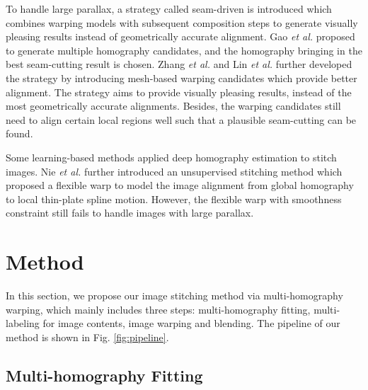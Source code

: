 \documentclass[10pt,twocolumn,letterpaper]{article}
\begin{document}
To handle large parallax, a strategy called seam-driven is introduced which combines warping models with subsequent composition steps to generate visually pleasing results instead of geometrically accurate alignment. Gao \emph{et al.} \cite{gao2013seam} proposed to generate multiple homography candidates, and the homography bringing in the best seam-cutting result is chosen. Zhang \emph{et al.} \cite{zhang2014parallax} and Lin \emph{et al.} \cite{lin2016seagull} further developed the strategy by introducing mesh-based warping candidates which provide better alignment. The strategy aims to provide visually pleasing results, instead of the most geometrically accurate alignments. Besides, the warping candidates still need to align certain local regions well such that a plausible seam-cutting can be found. 

Some learning-based methods \cite{nie2020view,nie2021unsupervised} applied deep homography estimation \cite{detone2016deep} to stitch images. Nie \emph{et al.} \cite{nie2023parallax} further introduced an unsupervised stitching method which proposed a flexible warp to model the image alignment from global homography to local thin-plate spline motion. However, the flexible warp with smoothness constraint still fails to handle images with large parallax.



\section{Method}
\label{sec:method}

In this section, we propose our image stitching method via multi-homography warping, which mainly includes three steps: multi-homography fitting, multi-labeling for image contents, image warping and blending. The pipeline of our method is shown in Fig. \ref{fig:pipeline}.



\subsection{Multi-homography Fitting}
\end{document}
